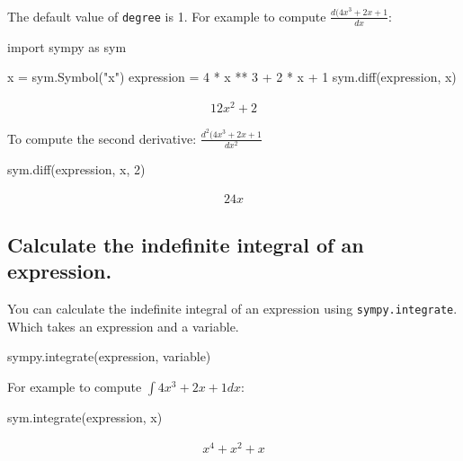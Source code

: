 The default value of \texttt{degree} is 1.
For example to compute \(\frac{d (4 x ^ 3 + 2 x + 1}{dx}\):




\begin{pyin}
import sympy as sym

x = sym.Symbol("x")
expression = 4 * x ** 3 + 2 * x + 1
sym.diff(expression, x)
\end{pyin}




\begin{equation*}
\begin{split}\displaystyle 12 x^{2} + 2\end{split}
\end{equation*}




To compute the second derivative: \(\frac{d ^ 2 (4 x ^ 3 + 2 x + 1}{dx ^ 2}\)




\begin{pyin}
sym.diff(expression, x, 2)
\end{pyin}




\begin{equation*}
\begin{split}\displaystyle 24 x\end{split}
\end{equation*}




\subsection{Calculate the indefinite integral of an expression.}

You can calculate the indefinite integral of an expression using
\texttt{sympy.integrate}. Which takes an expression and a variable.


\begin{api}
sympy.integrate(expression, variable)
\end{api}



For example to compute \(\int 4x^3 + 2x + 1 dx\):




\begin{pyin}
sym.integrate(expression, x)
\end{pyin}




\begin{equation*}
\begin{split}\displaystyle x^{4} + x^{2} + x\end{split}
\end{equation*}




